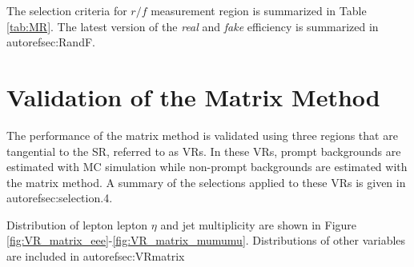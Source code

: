 The selection criteria for $r/f$ measurement region is summarized in Table \ref{tab:MR}. The latest version of the \emph{real} and \emph{fake} efficiency is summarized in autoref{sec:RandF}.

\begin{table}[th]
\sffamily
\centering
{}
\caption{Summary of the cuts applied to the $r$/$f$ measurement region.}
\label{tab:MR}
\end{table}
\section{Validation of the Matrix Method}
\label{sec:MMVR}

The performance of the matrix method is validated using three regions that are tangential to the SR, referred to as VRs. In these VRs, prompt backgrounds are estimated with MC simulation while non-prompt backgrounds are estimated with the matrix method. A summary of the selections applied to these VRs is given in autoref{sec:selection}.4. 

Distribution of lepton lepton $\eta$ and jet multiplicity are shown in Figure \ref{fig:VR_matrix_eee}-\ref{fig:VR_matrix_mumumu}. Distributions of other variables are included in autoref{sec:VRmatrix}


